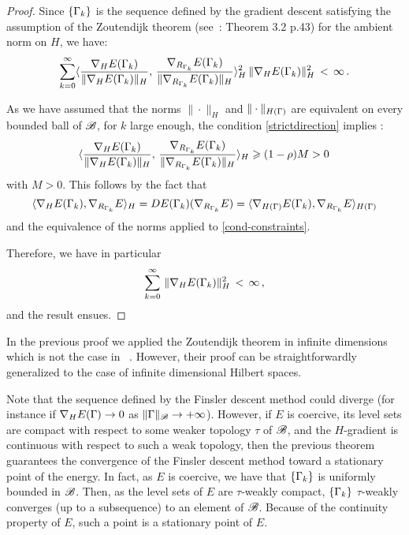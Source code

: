 \begin{proof} 
Since $\{ \Gamma_k \}$ is the sequence defined by the gradient descent satisfying the assumption of the Zoutendijk theorem (see~\cite{Nocedal}: Theorem 3.2 p.43) for the ambient norm on $H$, we have:
$$\sum_{k=0}^{\infty} \langle  
 		\frac{\nabla_{H}E (\Gamma_k)}{\|\nabla_{H} E(\Gamma_k)\|_H}
	,\, 
		\frac{\nabla_{R_{\Gamma_k}}E(\Gamma_k)}{\|\nabla_{R_{\Gamma_k}}E(\Gamma_k)\|_H} 
	\rangle_{H}^2 \,\|\nabla_{H} E(\Gamma_k)\|_{H}^2\, < \, \infty\,.$$


As we have assumed that the  norms $\|\cdot\|_H$ and $\|\cdot\|_{H(\Gamma)}$ are equivalent on every bounded ball of $\mathcal{B}$, for $k$ large enough, the condition \eqref{strictdirection} implies :
$$\langle  
 		\frac{\nabla_{H}E (\Gamma_{k})}{\|\nabla_{H} E(\Gamma_{k})\|_H}
	,\, 
		\frac{\nabla_{R_{\Gamma_{k}}}E(\Gamma_{k})}{\|\nabla_{R_{\Gamma_{k}}}E(\Gamma_{k})\|_H} 
	\rangle_{H} \geqslant (1 - \rho)M >0\,
$$
with $M>0$. 
This follows by the fact that 
$$ \langle \nabla_{H}E (\Gamma_{k}), 
\nabla_{R_{\Gamma_{k}}} E \rangle_H = DE(\Gamma_{k})
(\nabla_{R_{\Gamma_{k}}}E) = \langle \nabla_{H(\Gamma)}E 
(\Gamma_{k}), \nabla_{R_{\Gamma_{k}}}E\rangle_{H(\Gamma)}$$
and the equivalence of the norms applied to  \eqref{cond-constraints}.

Therefore, we have in particular
$$\sum_{k=0}^{\infty}  \, \|\nabla_{H} E(\Gamma_{k})\|_{H}^2\, < \, \infty\,,$$
and the result ensues.
\end{proof}

\begin{rem} 
 In the  previous proof we applied the Zoutendijk theorem in infinite dimensions which is not the case in ~\cite{Nocedal}. However, their proof can be straightforwardly generalized to the case of infinite dimensional  Hilbert spaces.
 \end{rem}
 
 
Note that the sequence defined by the Finsler descent method could diverge (for instance if $\nabla_H E(\Gamma)\rightarrow 0$ as $\|\Gamma\|_{\mathcal{B}}\rightarrow  +\infty$). However, if $E$ is coercive, its level sets are compact with respect to some weaker topology $\tau$ of $\mathcal{B}$, and the $H$-gradient is continuous with respect to such a  weak topology, then  the previous theorem guarantees  the convergence of the  Finsler descent  method toward a stationary point of the energy. In fact, as $E$ is coercive, we  have that $\{\Gamma_k\}$ is uniformly bounded in $\mathcal{B}$. Then, as   the level sets of $E$ are $\tau$-weakly compact,  $\{\Gamma_k\}$ $\tau$-weakly converges (up to a subsequence)
 to an element of $\mathcal{B}$. Because of the continuity property of $E$, such a point is a stationary point of $E$.



